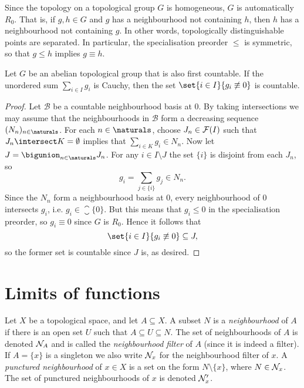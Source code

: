\documentclass[article, a4paper, 11pt, oneside]{memoir}
\numberwithin{equation}{chapter}
\newcommand{\calB}{\mathcal{B}}
\begin{document}
Since the topology on a topological group $G$ is homogeneous, $G$ is automatically $R_0$. That is, if $g,h \in G$ and $g$ has a neighbourhood not containing $h$, then $h$ has a neighbourhood not containing $g$. In other words, topologically distinguishable points are separated. In particular, the specialisation preorder $\leq$ is symmetric, so that $g \leq h$ implies $g \equiv h$.

\begin{lemma}
    Let $G$ be an abelian topological group that is also first countable. If the unordered sum $\sum_{i \in I} g_i$ is Cauchy, then the set $\set{i \in I}{g_i \not\equiv 0}$ is countable.
\end{lemma}

\begin{proof}
    Let $\calB$ be a countable neighbourhood basis at $0$. By taking intersections we may assume that the neighbourhoods in $\calB$ form a decreasing sequence $(N_n)_{n\in\naturals}$. For each $n \in \naturals$, choose $J_n \in \mathcal{F}(I)$ such that $J_n \intersect K = \emptyset$ implies that $\sum_{i \in K} g_i \in N_n$. Now let $J = \bigunion_{n\in\naturals} J_n$. For any $i \in I \setminus J$ the set $\{i\}$ is disjoint from each $J_n$, so
    \begin{equation*}
        g_i
            = \sum_{j \in \{i\}} g_j \in N_n.
    \end{equation*}
    Since the $N_n$ form a neighbourhood basis at $0$, every neighbourhood of $0$ intersects $g_i$, i.e. $g_i \in \closure{\{0\}}$. But this means that $g_i \leq 0$ in the specialisation preorder, so $g_i \equiv 0$ since $G$ is $R_0$. Hence it follows that
    \begin{equation*}
        \set{i \in I}{g_i \not\equiv 0}
            \subseteq J,
    \end{equation*}
    so the former set is countable since $J$ is, as desired.
\end{proof}


\section{Limits of functions} %

Let $X$ be a topological space, and let $A \subseteq X$. A subset $N$ is a \emph{neighbourhood} of $A$ if there is an open set $U$ such that $A \subseteq U \subseteq N$. The set of neighbourhoods of $A$ is denoted $\mathcal{N}_{A}$ and is called the \emph{neighbourhood filter} of $A$ (since it is indeed a filter). If $A = \{x\}$ is a singleton we also write $\mathcal{N}_{x}$ for the neighbourhood filter of $x$. A \emph{punctured neighbourhood} of $x \in X$ is a set on the form $N \setminus \{x\}$, where $N \in \mathcal{N}_{x}$. The set of punctured neighbourhoods of $x$ is denoted $\mathcal{N}'_{x}$.
\end{document}
